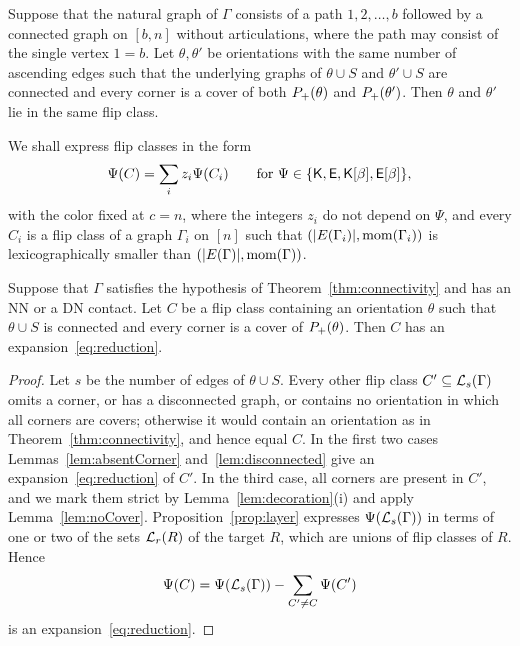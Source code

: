 \begin{theorem}\label{thm:connectivity}
Suppose that the natural graph of $\Gamma$ consists of a path $1,2,\dotsc,b$
followed by a connected graph on $[b,n]$ without articulations, where the path
may consist of the single vertex $1=b$.
Let $\theta,\theta'$ be orientations with the same number of ascending edges
such that the underlying graphs of $\theta\cup S$ and $\theta'\cup S$ are
connected and every corner is a cover of both $P_{+}(\theta)$ and
$P_{+}(\theta')$.
Then $\theta$ and $\theta'$ lie in the same flip class.
\end{theorem}

We shall express flip classes in the form
\begin{equation}\label{eq:reduction}
 \Psi(C)=\sum_iz_i\Psi(C_i)\qquad\text{for }\Psi\in\{\mathsf{K},\mathsf{E},\mathsf{K}[\beta],\mathsf{E}[\beta]\},
\end{equation}
with the color fixed at $c=n$, where the integers $z_i$ do not depend on $\Psi$,
and every $C_i$ is a flip class of a graph $\Gamma_i$ on $[n]$ such that
$(|E(\Gamma_i)|,\operatorname{mom}(\Gamma_i))$ is lexicographically smaller than
$(|E(\Gamma)|,\operatorname{mom}(\Gamma))$.

\begin{proposition}\label{prop:isolation}
Suppose that $\Gamma$ satisfies the hypothesis of Theorem~\ref{thm:connectivity}
and has an NN or a DN contact.
Let $C$ be a flip class containing an orientation $\theta$ such that
$\theta\cup S$ is connected and every corner is a cover of $P_{+}(\theta)$.
Then $C$ has an expansion~\eqref{eq:reduction}.
\end{proposition}

\begin{proof}
Let $s$ be the number of edges of $\theta\cup S$.
Every other flip class $C'\subseteq\mathcal{L}_s(\Gamma)$ omits a corner, or has a
disconnected graph, or contains no orientation in which all corners are covers;
otherwise it would contain an orientation as in Theorem~\ref{thm:connectivity},
and hence equal $C$.
In the first two cases Lemmas~\ref{lem:absentCorner} and~\ref{lem:disconnected}
give an expansion~\eqref{eq:reduction} of $C'$.
In the third case, all corners are present in $C'$, and we mark them strict by
Lemma~\ref{lem:decoration}(i) and apply Lemma~\ref{lem:noCover}.
Proposition~\ref{prop:layer} expresses $\Psi(\mathcal{L}_s(\Gamma))$ in terms of one or two
of the sets $\mathcal{L}_r(R)$ of the target $R$, which are unions of flip classes of
$R$.
Hence
\[
 \Psi(C)=\Psi(\mathcal{L}_s(\Gamma))-\sum_{C'\neq C}\Psi(C')
\]
is an expansion~\eqref{eq:reduction}.
\end{proof}

